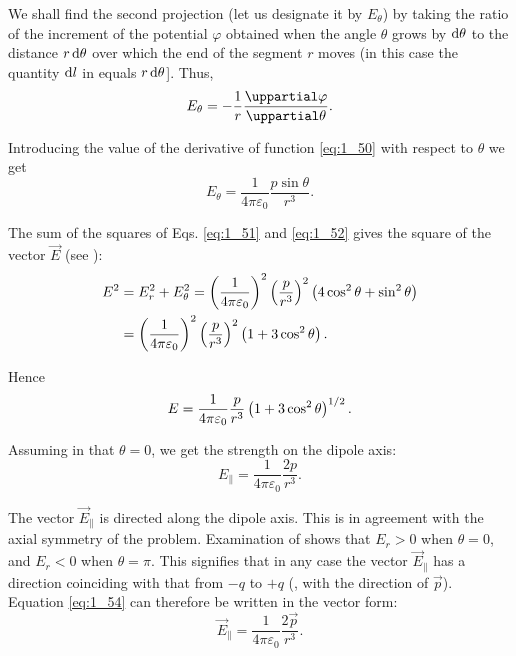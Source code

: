 \noindent
We shall find the second projection (let us designate it by $E_{\theta}$) by taking the ratio of the increment of the potential $\varphi$ obtained when the angle $\theta$ grows by $\mathrm{d}\theta$ to the distance $r\,\mathrm{d}\theta$ over which the end of the segment $r$ moves (in this case the quantity $\mathrm{d} l$ in  equals $r\,\mathrm{d}\theta$]. Thus,
\begin{equation*}
	E_{\theta} = - \frac{1}{r}\diffpartial{\varphi}{\theta}.
\end{equation*}

\noindent
Introducing the value of the derivative of function \eqref{eq:1_50} with respect to $\theta$ we get
\begin{equation}\label{eq:1_52}
	E_{\theta} = \frac{1}{4\pi\varepsilon_0} \frac{p\sin\theta}{r^3}.
\end{equation}

\noindent
The sum of the squares of Eqs. \eqref{eq:1_51} and \eqref{eq:1_52} gives the square of the vector $\vec{E}$ (see ):
\begin{align*}
	E^2 &= E_r^2 + E_{\theta}^2 = \left(\frac{1}{4\pi\varepsilon_0}\right)^2 \left(\frac{p}{r^3}\right)^2 \left(4\cos^2\theta + \sin^2\theta\right)\\
		&= \left(\frac{1}{4\pi\varepsilon_0}\right)^2 \left(\frac{p}{r^3}\right)^2 \left(1 + 3\cos^2\theta\right).
\end{align*}

\noindent
Hence
\begin{equation}\label{eq:1_53}
	E = \frac{1}{4\pi\varepsilon_0} \frac{p}{r^3} \left(1 + 3\cos^2\theta\right)^{1/2}.
\end{equation}

Assuming in  that $\theta=0$, we get the strength on the dipole axis:
\begin{equation}\label{eq:1_54}
	E_{\parallel} = \frac{1}{4\pi\varepsilon_0} \frac{2p}{r^3}.
\end{equation}

\noindent
The vector $\vec{E}_{\parallel}$ is directed along the dipole axis. This is in agreement with the axial symmetry of the problem. Examination of  shows that $E_r>0$ when $\theta=0$, and $E_r<0$ when $\theta=\pi$. This signifies that in any case the vector $\vec{E}_{\parallel}$ has a direction coinciding with that from $-q$ to $+q$ (\ie, with the direction of $\vec{p}$). Equation \eqref{eq:1_54} can therefore be written in the vector form:
\begin{equation}\label{eq:1_55}
	\vec{E}_{\parallel} = \frac{1}{4\pi\varepsilon_0} \frac{2\vec{p}}{r^3}.
\end{equation}

